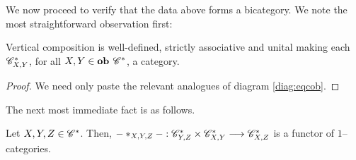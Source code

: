 \documentclass[./Thick_TQFTs_and_Quantum_Information.tex]{subfiles}
\begin{document}
We now proceed to verify that the data above forms a bicategory. We note the
most straightforward observation first:
\begin{lem}
Vertical composition is well-defined, strictly associative and unital making
each $\mathscr{C}^*_{X, Y}$, for all $X, Y \in \textbf{ob } \mathscr{C}^*$, a category.
\end{lem}
\begin{proof}
We need only paste the relevant analogues of diagram \eqref{diag:eqcob}.
\end{proof}

The next most immediate fact is as follows.
\begin{lem}
Let $X, Y, Z \in \mathscr{C}^*$. Then,
$- *_{X, Y, Z} - : \mathscr{C}^*_{Y, Z} \times \mathscr{C}^*_{X, Y} \stackrel{}{\longrightarrow} \mathscr{C}^*_{X, Z}$
is a functor of $1$--categories.
\end{lem}
\end{document}
